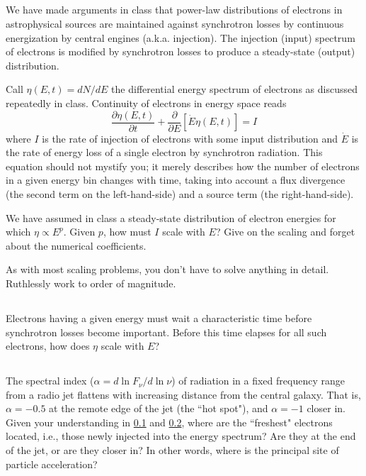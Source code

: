 \documentclass[11pt]{article}
\begin{document}
\subsection{}\label{partc}
We have made arguments in class that power-law distributions of electrons in
astrophysical sources are maintained against synchrotron losses by continuous
energization by central engines (a.k.a. injection). The injection (input)
spectrum of electrons is modified by synchrotron losses to produce a
steady-state (output) distribution.

Call $\eta(E,t)=dN/dE$ the differential energy spectrum of electrons as
discussed repeatedly in class. Continuity of electrons in energy space reads
\begin{equation}
\frac{\partial\eta(E,t)}{\partial t}+\frac{\partial}{\partial E}[\dot E\eta(E,t)]=I
\end{equation}
where $I$ is the rate of injection of electrons with some input distribution
and $\dot E$ is the rate of energy loss of a single electron by synchrotron
radiation. This equation should not mystify you; it merely describes how the
number of electrons in a given energy
bin changes with time, taking into account a flux divergence (the second term
on the left-hand-side) and a source term (the right-hand-side).

We have assumed in class a steady-state distribution of electron energies for which
$\eta\propto E^p$.  Given $p$, how must $I$ scale with $E$?  Give on the scaling and
forget about the numerical coefficients.

As with most scaling problems, you don’t have to solve anything in detail. Ruthlessly work to order of magnitude.

\subsection{}\label{partd}
Electrons having a given energy must wait a characteristic time 
before synchrotron losses become important. Before this time elapses 
for all such electrons, how does $\eta$ scale with $E$?

\subsection{}
The spectral index ($\alpha = d\ln F_\nu/d\ln\nu$) of radiation in a fixed frequency
range from a radio jet flattens with increasing distance from the central
galaxy. That is, $\alpha = -0.5$ at the remote edge of the jet (the ``hot spot"), and $\alpha=-1$
closer in. Given your understanding in \ref{partc} and \ref{partd}, where are the
``freshest" electrons located, i.e., those newly injected into the energy
spectrum? Are they at the end of the jet, or are they closer in? In other
words, where is the principal site of particle acceleration?
\end{document}
